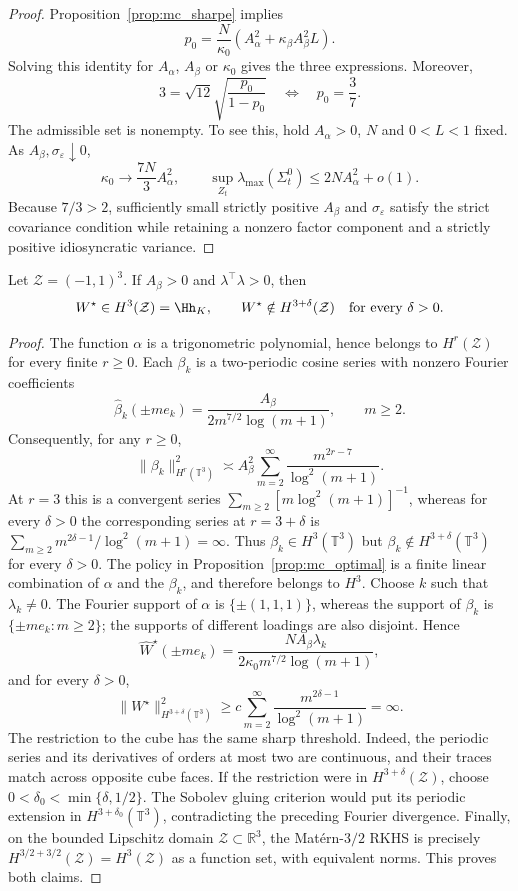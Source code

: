 \begin{proof}
Proposition~\ref{prop:mc_sharpe} implies
\[
p_0=\frac{N}{\kappa_0}
\left(A_\alpha^2+\kappa_\beta A_\beta^2L\right).
\]
Solving this identity for $A_\alpha$, $A_\beta$ or $\kappa_0$ gives the
three expressions. Moreover,
\[
3=\sqrt{12}\sqrt{\frac{p_0}{1-p_0}}
\quad\Longleftrightarrow\quad p_0=\frac37.
\]
The admissible set is nonempty. To see this, hold $A_\alpha>0$, $N$ and
$0<L<1$ fixed. As $A_\beta,\sigma_\varepsilon\downarrow0$,
\[
\kappa_0\longrightarrow\frac{7N}{3}A_\alpha^2,
\qquad
\sup_{Z_t}\lambda_{\max}(\Sigma_t^0)
\leq2NA_\alpha^2+o(1).
\]
Because $7/3>2$, sufficiently small strictly positive $A_\beta$ and
$\sigma_\varepsilon$ satisfy the strict covariance condition while
retaining a nonzero factor component and a strictly positive idiosyncratic
variance.
\end{proof}
\begin{proposition}
\label{prop:mc_sobolev}
Let $\mathcal Z=(-1,1)^3$. If $A_\beta>0$ and
$\lambda^\top\lambda>0$, then
\[
W^\star\in H^3(\mathcal Z)=\Hh_K,
\qquad
W^\star\notin H^{3+\delta}(\mathcal Z)
\quad\text{for every }\delta>0.
\]
\end{proposition}
\begin{proof}
The function $\alpha$ is a trigonometric polynomial, hence belongs to
$H^r(\mathcal Z)$ for every finite $r\geq0$. Each $\beta_k$ is a two-periodic
cosine series with nonzero Fourier coefficients
\[
\widehat\beta_k(\pm me_k)
=\frac{A_\beta}{2m^{7/2}\log(m+1)},\qquad m\geq2.
\]
Consequently, for any $r\geq0$,
\[
\|\beta_k\|_{H^r(\mathbb T^3)}^2
\asymp A_\beta^2\sum_{m=2}^\infty
\frac{m^{2r-7}}{\log^2(m+1)}.
\]
At $r=3$ this is a convergent series
$\sum_{m\geq2}[m\log^2(m+1)]^{-1}$, whereas for every
$\delta>0$ the corresponding series at $r=3+\delta$ is
$\sum_{m\geq2}m^{2\delta-1}/\log^2(m+1)=\infty$.
Thus $\beta_k\in H^3(\mathbb T^3)$ but
$\beta_k\notin H^{3+\delta}(\mathbb T^3)$ for every $\delta>0$.
The policy in Proposition~\ref{prop:mc_optimal} is a finite linear
combination of $\alpha$ and the $\beta_k$, and therefore belongs to $H^3$.
Choose $k$ such that $\lambda_k\neq0$. The Fourier support of $\alpha$
is $\{\pm(1,1,1)\}$, whereas the support of $\beta_k$ is
$\{\pm me_k:m\geq2\}$; the supports of different loadings are also
disjoint. Hence
\[
\widehat W^\star(\pm me_k)
=\frac{NA_\beta\lambda_k}{2\kappa_0m^{7/2}\log(m+1)},
\]
and for every $\delta>0$,
\[
\|W^\star\|_{H^{3+\delta}(\mathbb T^3)}^2
\geq c\sum_{m=2}^\infty
\frac{m^{2\delta-1}}{\log^2(m+1)}=\infty.
\]
The restriction to the cube has the same sharp threshold. Indeed, the
periodic series and its derivatives of orders at most two are continuous,
and their traces match across opposite cube faces. If the restriction were
in $H^{3+\delta}(\mathcal Z)$, choose
$0<\delta_0<\min\{\delta,1/2\}$. The Sobolev gluing criterion would put
its periodic extension in $H^{3+\delta_0}(\mathbb T^3)$, contradicting
the preceding Fourier divergence.
Finally, on the bounded Lipschitz domain $\mathcal Z\subset\mathbb R^3$,
the Mat\'ern-$3/2$ RKHS is precisely $H^{3/2+3/2}(\mathcal Z)=H^3(\mathcal Z)$
as a function set, with equivalent norms. This proves both claims.
\end{proof}
